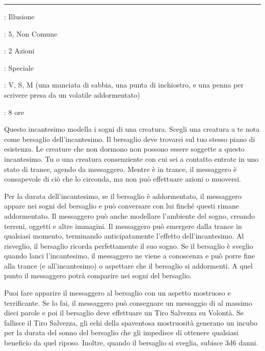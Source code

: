 \begin{multicols}{2}
\smallskip\noindent\rule{\linewidth}{2pt} \hypertarget{Sogno}{}\medskip{}
\noindent
\begin{description}[noitemsep, topsep=0pt, parsep=0pt, partopsep=0pt, leftmargin=0cm, labelwidth=2.8cm]
	\item[\textbf{Lista di Magia}]: Illusione
	\item[\textbf{Livello}]: 5, Non Comune
	\item[\textbf{T. di Lancio}]: 2 Azioni
	\item[\textbf{Gittata}]: Speciale
	\item[\textbf{Componenti}]: V, S, M (una manciata di sabbia, una punta di inchiostro, e una penna per scrivere presa da un volatile addormentato)
	\item[\textbf{Durata}]: 8 ore
\end{description}

Questo incantesimo modella i sogni di una creatura. Scegli una creatura a te nota come bersaglio dell'incantesimo. Il bersaglio deve trovarsi sul tuo stesso piano di esistenza. Le creature che non dormono non possono essere soggette a questo incantesimo. Tu o una creatura consenziente con cui sei a contatto entrate in uno stato di trance, agendo da messaggero. Mentre è in trance, il messaggero è consapevole di ciò che lo circonda, ma non può effettuare azioni o muoversi.

Per la durata dell'incantesimo, se il bersaglio è addormentato, il messaggero appare nei sogni del bersaglio e può conversare con lui finché questi rimane addormentato. Il messaggero può anche modellare l'ambiente del sogno, creando terreni, oggetti e altre immagini. Il messaggero può emergere dalla trance in qualsiasi momento, terminando anticipatamente l'effetto dell'incantesimo. Al risveglio, il bersaglio ricorda perfettamente il suo sogno. Se il bersaglio è sveglio quando lanci l'incantesimo, il messaggero ne viene a conoscenza e può porre fine alla trance (e all'incantesimo) o aspettare che il bersaglio si addormenti. A quel punto il messaggero potrà comparire nei sogni del bersaglio.

Puoi fare apparire il messaggero al bersaglio con un aspetto mostruoso e terrificante. Se lo fai, il messaggero può consegnare un messaggio di al massimo dieci parole e poi il bersaglio deve effettuare un Tiro Salvezza su Volontà. Se fallisce il Tiro Salvezza, gli echi della spaventosa mostruosità generano un incubo per la durata del sonno del bersaglio che gli impedisce di ottenere qualsiasi beneficio da quel riposo. Inoltre, quando il bersaglio si sveglia, subisce 3d6 danni.


\end{multicols}
